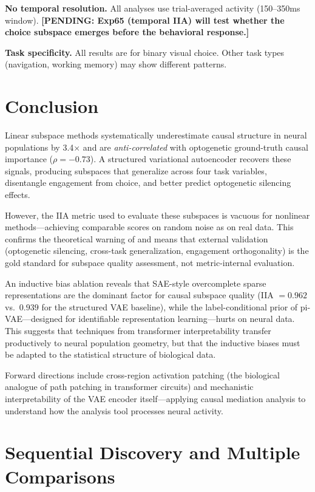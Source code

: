 \documentclass{article}
\newcommand{\pending}[1]{\textcolor{red!70!black}{\textbf{[PENDING: #1]}}}
\begin{document}
\textbf{No temporal resolution.} All analyses use trial-averaged activity (150--350ms window). \pending{Exp65 (temporal IIA) will test whether the choice subspace emerges before the behavioral response.}

\textbf{Task specificity.} All results are for binary visual choice. Other task types (navigation, working memory) may show different patterns.

\section{Conclusion}

Linear subspace methods systematically underestimate causal structure in neural populations by 3.4$\times$ and are \emph{anti-correlated} with optogenetic ground-truth causal importance ($\rho = -0.73$). A structured variational autoencoder recovers these signals, producing subspaces that generalize across four task variables, disentangle engagement from choice, and better predict optogenetic silencing effects.

However, the IIA metric used to evaluate these subspaces is vacuous for nonlinear methods---achieving comparable scores on random noise as on real data. This confirms the theoretical warning of \citet{sutter2025iia} and means that external validation (optogenetic silencing, cross-task generalization, engagement orthogonality) is the gold standard for subspace quality assessment, not metric-internal evaluation.

An inductive bias ablation reveals that SAE-style overcomplete sparse representations are the dominant factor for causal subspace quality (IIA $= 0.962$ vs.\ $0.939$ for the structured VAE baseline), while the label-conditional prior of pi-VAE---designed for identifiable representation learning---hurts on neural data. This suggests that techniques from transformer interpretability transfer productively to neural population geometry, but that the inductive biases must be adapted to the statistical structure of biological data.

Forward directions include cross-region activation patching (the biological analogue of path patching in transformer circuits) and mechanistic interpretability of the VAE encoder itself---applying causal mediation analysis to understand how the analysis tool processes neural activity.




\appendix
\section{Sequential Discovery and Multiple Comparisons}
\label{app:sequential}
\end{document}
